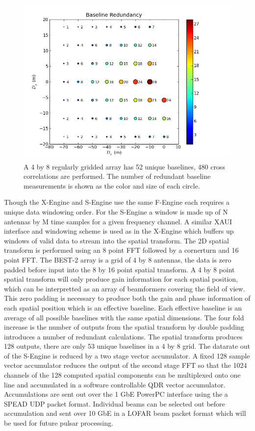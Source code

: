 \documentclass[useAMS,usenatbib,onecolumn]{mn2e}
\begin{document}
\begin{figure}
    \centering
    \includegraphics[scale=0.6]{graphics/redbl.png}
    \caption{A 4 by 8 regularly gridded array has 52 unique baselines, 480 cross correlations are performed. The number of redundant baseline measurements is shown as the color and size of each circle.}
    \label{fig:redbl}
\end{figure}

Though the X-Engine and S-Engine use the same F-Engine each requires a unique data windowing order.
For the S-Engine a window is made up of N antennas by M time samples for a given frequency channel.
A similar XAUI interface and windowing scheme is used as in the X-Engine which buffers up windows of valid data to stream into the spatial transform.
The 2D spatial transform is performed using an 8 point FFT followed by a cornerturn and 16 point FFT.
The BEST-2 array is a grid of 4 by 8 antennas, the data is zero padded before input into the 8 by 16 point spatial transform.
A 4 by 8 point spatial transform will only produce gain information for each spatial position, which can be interpretted as an array of beamformers covering the field of view.
This zero padding is necessary to produce both the gain and phase information of each spatial position which is an effective baseline.
Each effective baseline is an average of all possible baselines with the same spatial dimensions.
The four fold increase is the number of outputs from the spatial transform by double padding introduces a number of redundant calculations.
The spatial transform produces 128 outputs, there are only 53 unique baselines in a 4 by 8 grid.
The datarate out of the S-Engine is reduced by a two stage vector accumulator.
A fixed 128 sample vector accumulator reduces the output of the second stage FFT so that the 1024 channels of the 128 computed spatial components can be multiplexed onto one line and accumulated in a software controllable QDR vector accumulator.
Accumulations are sent out over the 1 GbE PowerPC interface using the a SPEAD UDP packet format.
Individual beams can be selected out before accumulation and sent over 10 GbE in a LOFAR beam packet format which will be used for future pulsar processing.
\end{document}

